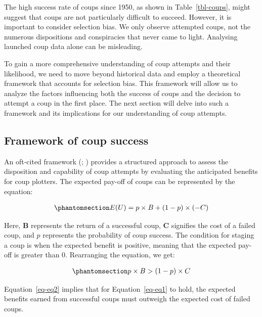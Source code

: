 \documentclass[
  12pt,
]{report}
\begin{document}
The high success rate of coups since 1950, as shown in
Table~\ref{tbl-coups}, might suggest that coups are not particularly
difficult to succeed. However, it is important to consider selection
bias. We only observe attempted coups, not the numerous dispositions and
conspiracies that never came to light. Analysing launched coup data
alone can be misleading.

To gain a more comprehensive understanding of coup attempts and their
likelihood, we need to move beyond historical data and employ a
theoretical framework that accounts for selection bias. This framework
will allow us to analyze the factors influencing both the success of
coups and the decision to attempt a coup in the first place. The next
section will delve into such a framework and its implications for our
understanding of coup attempts.

\subsection{Framework of coup success}\label{framework-of-coup-success}

An oft-cited framework (; ) provides a
structured approach to assess the disposition and capability of coup
attempts by evaluating the anticipated benefits for coup plotters. The
expected pay-off of coups can be represented by the equation:

\begin{equation}\phantomsection\label{eq-eq1}{
\begin{aligned}
E(U) = p \times B + (1 - p) \times (-C)
\end{aligned}
}\end{equation}

Here, \(\mathbf B\) represents the return of a successful coup,
\(\mathbf C\) signifies the cost of a failed coup, and \(p\) represents
the probability of coup success. The condition for staging a coup is
when the expected benefit is positive, meaning that the expected pay-off
is greater than 0. Rearranging the equation, we get:

\begin{equation}\phantomsection\label{eq-eq2}{
\begin{aligned}
p \times B > (1 - p) \times C
\end{aligned}
}\end{equation}

Equation~\ref{eq-eq2} implies that for Equation~\ref{eq-eq1} to hold,
the expected benefits earned from successful coups must outweigh the
expected cost of failed coups.
\end{document}
